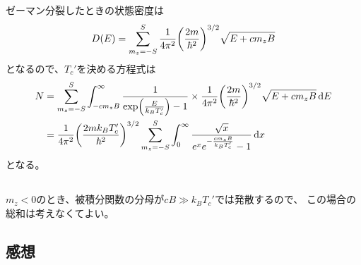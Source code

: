 \documentclass[../../sp_2021.tex]{subfiles}
\begin{document}
\subsection{}
ゼーマン分裂したときの状態密度は
\begin{equation}\begin{aligned}[b]
    D(E)=\sum_{m_z=-S}^{S}\frac{1}{4\pi^2}\qty(\frac{2m}{\hbar^2})^{3/2}\sqrt{E+cm_zB}
\end{aligned}\end{equation}
となるので、\(T_c'\)を決める方程式は
\begin{equation}\begin{aligned}[b]
    N &= \sum_{m_z=-S}^{S}\int_{-cm_zB}^{\infty}\frac{1}{\exp(\frac{E}{k_BT_c'})-1}\times \frac{1}{4\pi^2}\qty(\frac{2m}{\hbar^2})^{3/2}\sqrt{E+cm_zB} \dd{E}\\
    &= \frac{1}{4\pi^2}\qty(\frac{2mk_BT_c'}{\hbar^2})^{3/2}\sum_{m_z=-S}^{S}\int_{0}^{\infty} \frac{\sqrt{x}}{e^xe^{-\frac{cm_zB}{k_BT_c'}}-1}\dd{x}
\end{aligned}\end{equation}
となる。

\subsection{}
\(m_z<0\)のとき、被積分関数の分母が\(cB\gg k_BT_c'\)では発散するので、
この場合の総和は考えなくてよい。


\subsection*{感想}
\end{document}
